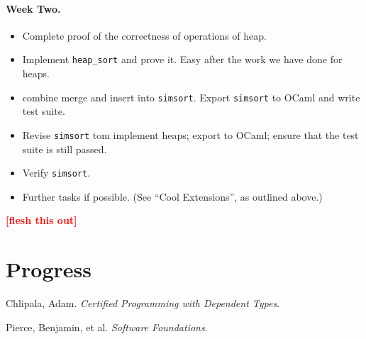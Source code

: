 \documentclass{article}
\newcommand{\todo}[1]{\textcolor{red}{\textbf{\textsf{[#1]}}}}
\begin{document}
\paragraph{Week Two.}
\begin{itemize}
\item Complete proof of the correctness of operations of heap.
\item Implement \verb+heap_sort+ and prove it. Easy after the work we have done for heaps.
\item combine merge and insert into \verb`simsort`.
  Export \verb+simsort+ to OCaml and write test suite.
\item Revise \verb`simsort` tom implement heaps; export to OCaml;
  ensure that the test suite is still passed.
\item Verify \verb`simsort`.
\item Further tasks if possible. (See ``Cool Extensions'', as outlined above.)
\end{itemize}

\todo{flesh this out}

\section{Progress}


\begin{thebibliography}{xx}
    Chlipala, Adam. \emph{Certified Programming with Dependent Types}.

    Pierce, Benjamin, et al. \emph{Software Foundations}.

%
\end{thebibliography}
\end{document}
